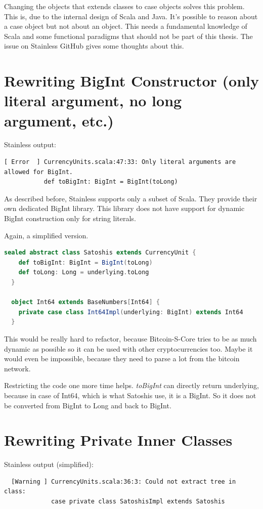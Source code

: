 Changing the objects that extends classes to case objects solves this problem.
This is, due to the internal design of Scala and Java.
It's possible to reason about a case object but not about an object.
This needs a fundamental knowledge of Scala and some functional paradigms that should not be part of this thesis.
The issue  on Stainless GitHub gives some thoughts about this.


\section{Rewriting BigInt Constructor (only literal argument, no long argument, etc.)}
Stainless output:
\begin{verbatim}
[ Error  ] CurrencyUnits.scala:47:33: Only literal arguments are allowed for BigInt.
           def toBigInt: BigInt = BigInt(toLong)
\end{verbatim}

As described before, Stainless supports only a subset of Scala.
They provide their own dedicated BigInt library.
This library does not have support for dynamic BigInt construction only for string literals.

Again, a simplified version.
\begin{lstlisting}[language=scala]
  sealed abstract class Satoshis extends CurrencyUnit {
    def toBigInt: BigInt = BigInt(toLong)
    def toLong: Long = underlying.toLong
  }

  object Int64 extends BaseNumbers[Int64] {
    private case class Int64Impl(underlying: BigInt) extends Int64
  }
\end{lstlisting}

This would be really hard to refactor, because Bitcoin-S-Core tries to be as much dynamic as possible so it can be used with other cryptocurrencies too.
Maybe it would even be impossible, because they need to parse a lot from the bitcoin network.

Restricting the code one more time helps.
\emph{toBigInt} can directly return underlying, because in case of Int64, which is what Satoshis use, it is a BigInt.
So it does not be converted from BigInt to Long and back to BigInt.


\section{Rewriting Private Inner Classes}
Stainless output (simplified):
\begin{verbatim}
  [Warning ] CurrencyUnits.scala:36:3: Could not extract tree in class:
             case private class SatoshisImpl extends Satoshis
\end{verbatim}

